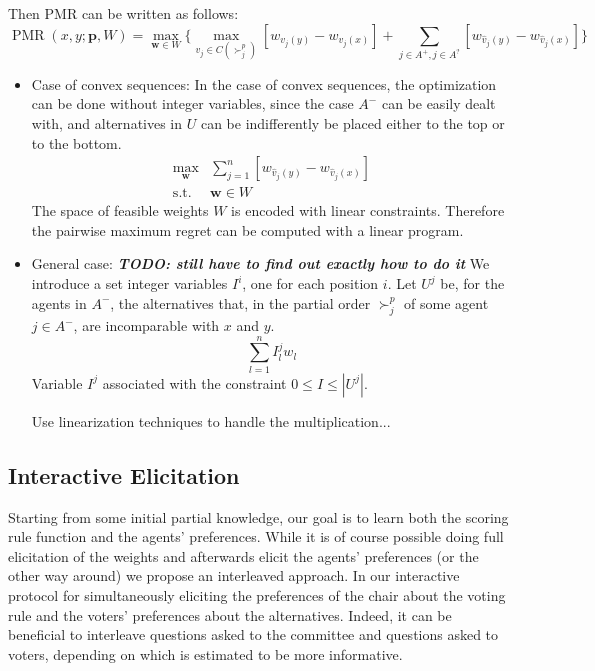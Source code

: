 \documentclass[12pt]{article}
\newcommand{\pprofile}{\textbf{p}}%
\newcommand{\w}{\textbf{w}}%
\DeclareMathOperator{\PMR}{PMR}
\begin{document}
Then PMR can be written as follows:
\[ \PMR(x,y; \pprofile, W) = \max_{\w \in W} \Big \{ \max_{v_j \in C(\succ_j^p)} [w_{v_j(y)} - w_{v_j(x)}]  + \sum_{j \in A^+, j \in A^?} [w_{\hat{v}_j(y)} - w_{\hat{v}_j(x)}] \Big \} \] 


\begin{itemize}
 \item Case of convex sequences:
In the case of convex sequences, the optimization can be done without integer variables, since the case $A^-$ can be easily dealt with, and alternatives in $U$ can be indifferently be placed either to the top or to the bottom.
\begin{align*}
\max_{\w} & \sum_{j=1}^{n}  [w_{\hat{v}_j(y)} - w_{\hat{v}_j(x)}] \\
\text{s.t.} & \w \in W
\end{align*}
The space of feasible weights $W$ is encoded with linear constraints.
Therefore the pairwise maximum regret can be computed with a linear program.
 
 \item General case:
{\bf \em TODO: still have to find out exactly how to do it}
We introduce a set integer variables $I^i$, one for each position $i$.
 Let $U^j$ be, for the agents in $A^-$, the alternatives that, in the partial order $\succ^p_j$ of some agent $j \in A^-$, are incomparable with $x$ and $y$.
 \[ \sum_{l=1}^n I^j_l w_l \]
  Variable $I^j$ associated with the constraint $0 \leq I \leq |U^j|$.
  
  Use linearization techniques to handle the multiplication...
\end{itemize}


\subsection{Interactive Elicitation}
Starting from some initial partial knowledge, our goal is to learn both the scoring rule function and the agents' preferences.
While it is of course possible doing full elicitation of the weights and afterwards elicit the agents' preferences (or the other way around) we propose an interleaved approach.
In our interactive  protocol for simultaneously eliciting the preferences of the chair about the voting rule and the voters' preferences about the alternatives.
Indeed, it can be beneficial to interleave questions asked to the committee and questions asked to voters, depending on which is estimated to be more informative.
\end{document}
